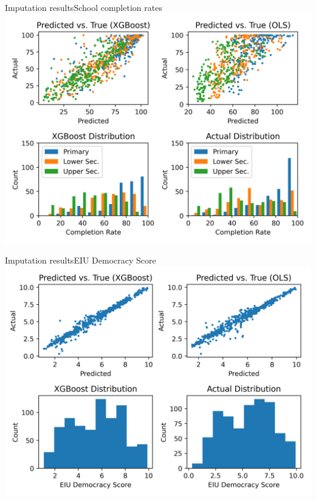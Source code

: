 \documentclass[10pt]{beamer}
\begin{document}
\begin{frame}{Imputation results}{School completion rates}
    \centering
    \includegraphics[width=\textwidth]{../build/xgboost.png}
\end{frame}

\begin{frame}{Imputation results}{EIU Democracy Score}
    \centering
    \includegraphics[width=\textwidth]{../build/eiu_xgboost.png}
\end{frame}
\end{document}
